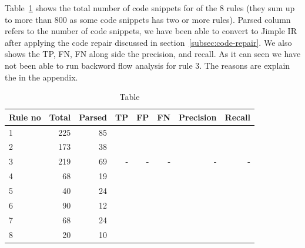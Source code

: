 Table~\ref{tab:results} shows the total number of code snippets for of the 8 rules (they sum up to more than 800 as some code snippets has two or more rules). Parsed column refers to the number of code snippets, we have been able to convert to Jimple IR after applying the code repair discussed in section~\ref{subsec:code-repair}. We also shows the TP, FN, FN along side the precision, and recall.
As it can seen we have not been able to run backword flow analysis for rule 3. The reasons are explain the in the appendix.


\begin{table}[ht]
\begin{tabular}{|l|r|r|r|r|r|r|r|}
\toprule
Rule no & Total & Parsed & TP & FP & FN & Precision & Recall \\ \midrule
1 & 225 & 85 & & & &  & \\
2 & 173 & 38 & & & & & \\
3 & 219 & 69 & - & - & - & - & - \\
4 & 68 & 19 &  & & & & \\
5 & 40 & 24 & & & & & \\
6 & 90 & 12 & & & & & \\ \midrule
7 & 68 & 24 & & & & &\\
8 & 20 & 10 & & & & &\\        
\bottomrule
\end{tabular}
\caption{Table}
\label{tab:results}
\end{table}